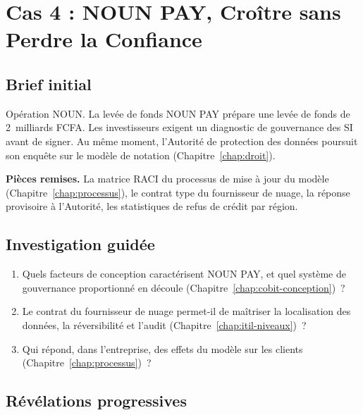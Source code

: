 \section{Cas 4 : NOUN PAY, Croître sans Perdre la Confiance}
\label{sec:c17-noun}

\subsection{Brief initial}

\begin{boxscenario}{Opération NOUN. La levée de fonds}
NOUN PAY prépare une levée de fonds de 2~milliards FCFA. Les investisseurs
exigent un diagnostic de gouvernance des SI avant de signer. Au même
moment, l'Autorité de protection des données poursuit son enquête sur le
modèle de notation (Chapitre~\ref{chap:droit}).

\medskip
\textbf{Pièces remises.} La matrice RACI du processus de mise à jour du
modèle (Chapitre~\ref{chap:processus}), le contrat type du fournisseur de
nuage, la réponse provisoire à l'Autorité, les statistiques de refus de
crédit par région.
\end{boxscenario}

\subsection{Investigation guidée}

\begin{enumerate}
    \item Quels facteurs de conception caractérisent NOUN PAY, et quel
          système de gouvernance proportionné en découle
          (Chapitre~\ref{chap:cobit-conception})~?
    \item Le contrat du fournisseur de nuage permet-il de maîtriser la
          localisation des données, la réversibilité et l'audit
          (Chapitre~\ref{chap:itil-niveaux})~?
    \item Qui répond, dans l'entreprise, des effets du modèle sur les
          clients (Chapitre~\ref{chap:processus})~?
\end{enumerate}

\subsection{Révélations progressives}

